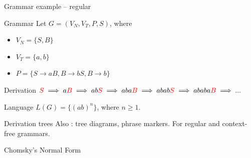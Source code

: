 \documentclass{beamer}
\begin{document}
\begin{frame}{Grammar example -- regular}
	
	\begin{block}{Grammar}
		Let $G = (V_N, V_T, P, S)$, where 
		\begin{itemize}
			\item $V_N = \{S, B\}$
			\item $V_T = \{a,b\}$
			\item $P = \{S \rightarrow aB, B \rightarrow bS, B \rightarrow b\}$
		\end{itemize}
	\end{block}
	
	\begin{block}{Derivation}
		$\textcolor{red}{S} \implies a\textcolor{red}{B} \implies ab\textcolor{red}{S} \implies aba\textcolor{red}{B} \implies abab\textcolor{red}{S} \implies ababa\textcolor{red}{B} \implies ...$
	\end{block}
	
	\begin{block}{Language}
		$L(G) = \{(ab)^n\}$, where $n\geq 1$.
	\end{block}
	
\end{frame}

\begin{frame}{Derivation trees}
	Also : tree diagrams, phrase markers. For regular and context-free grammars.
\end{frame}

\begin{frame}{Chomsky's Normal Form}
	
\end{frame}




\end{document}
